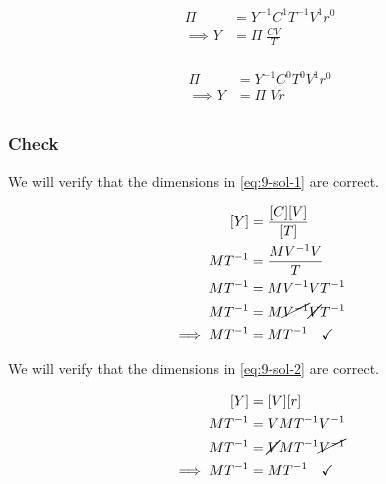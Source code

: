 \documentclass[12pt]{article}
\begin{document}
  \begin{multicols}{2}
    \begin{equation}
      \label{eq:9-sol-1}
      \boxed{
      \begin{aligned}
        \Pi &= Y^{-1} C^{1} T^{-1} V^1 r^0 \\
        \implies Y &= \Pi\;\frac{CV}{T} \\
      \end{aligned}
      }
    \end{equation}

    \begin{equation}
      \label{eq:9-sol-2}
      \boxed{
      \begin{aligned}
        \Pi &= Y^{-1} C^{0} T^{0} V^1 r^0 \\
        \implies Y &= \Pi\; Vr \\
      \end{aligned}
      }
    \end{equation}
  \end{multicols}

  \subsubsection*{Check}
  We will verify that the dimensions in \cref{eq:9-sol-1} are correct.

  \begin{equation}
    \begin{aligned}
      [Y] &= \frac{[C][V]}{[T]} \\
      MT^{-1} &= \frac{MV^{-1}V}{T} \\
      MT^{-1} &= MV^{-1}VT^{-1} \\
      MT^{-1} &= M\cancel{V^{-1}}\cancel{V}T^{-1} \\
      \implies MT^{-1} &= MT^{-1} \quad\checkmark \\
    \end{aligned}
  \end{equation}

  We will verify that the dimensions in \cref{eq:9-sol-2} are correct.

  \begin{equation}
    \begin{aligned}
      [Y] &= [V] [r] \\
      MT^{-1} &= V MT^{-1}V^{-1} \\
      MT^{-1} &= \cancel{V} MT^{-1} \cancel{V^{-1}} \\
      \implies MT^{-1} &= MT^{-1} \quad\checkmark \\
    \end{aligned}
  \end{equation}
\end{document}
